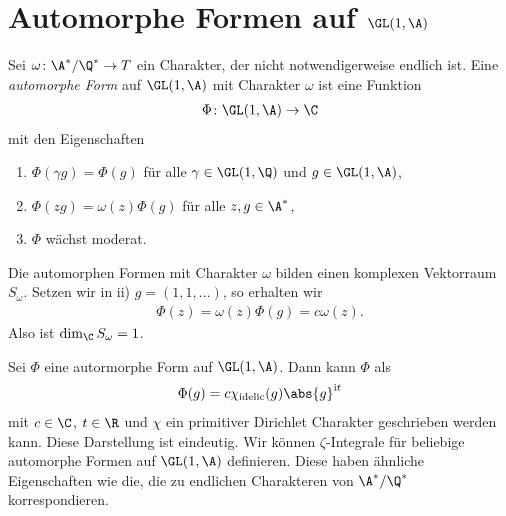 \chapter{Automorphe Formen auf $\GL(1,\A)$}
\begin{defi}
Sei $\omega \colon \A^\ast /\Q^\ast \to T$ ein Charakter, der nicht notwendigerweise endlich ist.
Eine \emph{automorphe Form} auf $\GL(1,\A)$ mit Charakter $\omega$
ist eine Funktion
\begin{align*}
\Phi \colon \GL(1,\A) \to \C
\end{align*}
mit den Eigenschaften
\begin{enumerate}[label=(\roman*)]
\item $\Phi(\gamma g)=\Phi(g)$ für alle $\gamma \in \GL(1,\Q)$ und $g \in \GL(1,\A)$,
\item $\Phi(zg)=\omega(z)\Phi(g)$ für alle $z,g \in \A^\ast$,
\item $\Phi$ wächst moderat.
\end{enumerate}
\end{defi}

Die automorphen Formen mit Charakter $\omega$ bilden einen komplexen
Vektorraum $S_\omega$.
Setzen wir in ii) $g=(1,1,\dots)$, so erhalten wir 
\begin{align*}
\Phi(z)=\omega(z)\Phi(g)=c \omega(z).
\end{align*}
Also ist $\dim_\C S_\omega=1$.

\begin{thm}
Sei $\Phi$ eine autormorphe Form auf $\GL(1,\A)$.
Dann kann $\Phi$ als
\begin{align*}
\Phi(g)=c \chi_{\text{idelic}}(g)\abs{g}^{\mathrm{i}t}
\end{align*}
mit $c \in \C$, $t \in \R$ und $\chi$ ein primitiver Dirichlet Charakter geschrieben werden kann.
Diese Darstellung ist eindeutig.
Wir können $\zeta$-Integrale für beliebige automorphe Formen
auf $\GL(1,\A)$ definieren.
Diese haben ähnliche Eigenschaften wie die, die zu endlichen Charakteren von $\A^\ast /\Q^\ast$ korrespondieren.
\end{thm}